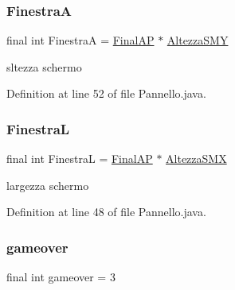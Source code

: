 \mbox{\label{classa_1_1survival_1_1game_1_1_pannello_aa40a02fd0e358e545d2d3669b38dcc90}} 
\subsubsection{\texorpdfstring{FinestraA}{FinestraA}}
{\footnotesize\ttfamily final int FinestraA = \hyperlink{classa_1_1survival_1_1game_1_1_pannello_a254f39b8c0d713267b41082239e95bed}{Final\+AP} $\ast$ \hyperlink{classa_1_1survival_1_1game_1_1_pannello_ac5f4442e9873fde75688c00c817c49f6}{Altezza\+S\+MY}}

sltezza schermo 

Definition at line 52 of file Pannello.\+java.

\mbox{\label{classa_1_1survival_1_1game_1_1_pannello_a319dcf1279476cf946d73808e782d39c}} 
\subsubsection{\texorpdfstring{FinestraL}{FinestraL}}
{\footnotesize\ttfamily final int FinestraL = \hyperlink{classa_1_1survival_1_1game_1_1_pannello_a254f39b8c0d713267b41082239e95bed}{Final\+AP} $\ast$ \hyperlink{classa_1_1survival_1_1game_1_1_pannello_a3373f5f9365b8e16cdf3a7bb6d6c0bc9}{Altezza\+S\+MX}}

largezza schermo 

Definition at line 48 of file Pannello.\+java.

\mbox{\label{classa_1_1survival_1_1game_1_1_pannello_a9c21caf52c4f3bfeb8b074c16f5775a4}} 
\subsubsection{\texorpdfstring{gameover}{gameover}}
{\footnotesize\ttfamily final int gameover = 3}



